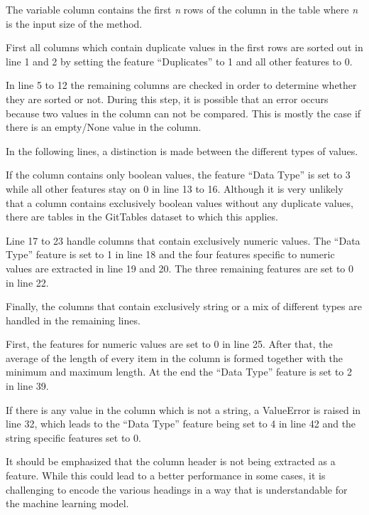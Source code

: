 The variable column contains the first \textit{n} rows of the column in the table where \textit{n} is the input size of the method.

First all columns which contain duplicate values in the first rows are sorted out in line 1 and 2 by setting the feature \enquote{Duplicates} to \num{1} and all other features to \num{0}.

In line 5 to 12 the remaining columns are checked in order to determine whether they are sorted or not. During this step, it is possible that an error occurs because two values in the column can not be compared. This is mostly the case if there is an empty/None value in the column.

In the following lines, a distinction is made between the different types of values.

If the column contains only boolean values, the feature \enquote{Data Type} is set to \num{3} while all other features stay on \num{0} in line 13 to 16. Although it is very unlikely that a column contains exclusively boolean values without any duplicate values, there are tables in the GitTables dataset to which this applies. %

Line 17 to 23 handle columns that contain exclusively numeric values. The \enquote{Data Type} feature is set to \num{1} in line 18 and the four features specific to numeric values are extracted in line 19 and 20. The three remaining features are set to \num{0} in line 22. %

Finally, the columns that contain exclusively string or a mix of different types are handled in the remaining lines.

First, the features for numeric values are set to 0 in line 25. After that, the average of the length of every item in the column is formed together with the minimum and maximum length. At the end the \enquote{Data Type} feature is set to \num{2} in line 39.

If there is any value in the column which is not a string, a ValueError is raised in line 32, which leads to the \enquote{Data Type} feature being set to \num{4} in line 42 and the string specific features set to \num{0}.

It should be emphasized that the column header is not being extracted as a feature. While this could lead to a better performance in some cases, it is challenging to encode the various headings in a way that is understandable for the machine learning model. %

